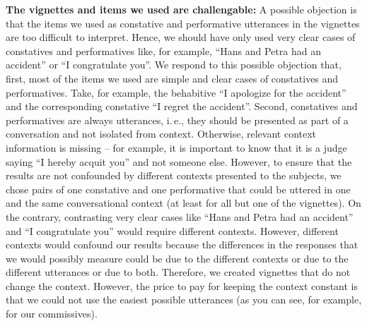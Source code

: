 \documentclass[egregdoesnotlikesansseriftitles,12pt]{scrartcl}
\begin{document}
\noindent\textbf{The vignettes and items we used are challengable:} A possible objection is that the items we used as constative and performative utterances in the vignettes are too difficult to interpret. Hence, we should have only used very clear cases of constatives and performatives like, for example, ``Hans and Petra had an accident'' or ``I congratulate you''. We respond to this possible objection that, first, most of the items we used are simple and clear cases of constatives and performatives. Take, for example, the behabitive ``I apologize for the accident'' and the corresponding constative ``I regret the accident''. Second, constatives and performatives are always utterances, i.\,e., they should be presented as part of a conversation and not isolated from context. Otherwise, relevant context information is missing – for example, it is important to know that it is a judge saying ``I hereby acquit you'' and not someone else. However, to ensure that the results are not confounded by different contexts presented to the subjects, we chose pairs of one constative and one performative that could be uttered in one and the same conversational context (at least for all but one of the vignettes). On the contrary, contrasting very clear cases like ``Hans and Petra had an accident'' and ``I congratulate you'' would require different contexts. However, different contexts would confound our results because the differences in the responses that we would possibly measure could be due to the different contexts or due to the different utterances or due to both. Therefore, we created vignettes that do not change the context. However, the price to pay for keeping the context constant is that we could not use the easiest possible utterances (as you can see, for example, for our commissives).\\
\end{document}
